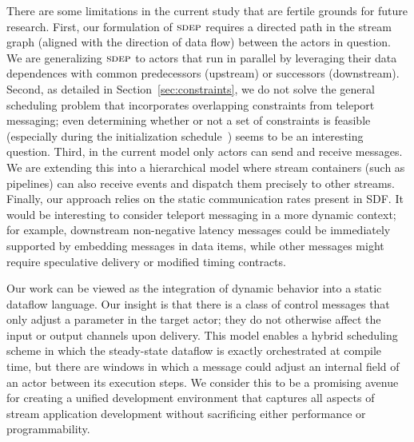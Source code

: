 There are some limitations in the current study that are fertile
grounds for future research.  First, our formulation of $\textsc{sdep}$
requires a directed path in the stream graph (aligned with the
direction of data flow) between the actors in question.  We are
generalizing $\textsc{sdep}$ to actors that run in parallel by leveraging
their data dependences with common predecessors (upstream) or
successors (downstream).  Second, as detailed in
Section~\ref{sec:constraints}, we do not solve the general scheduling
problem that incorporates overlapping constraints from teleport
messaging; even determining whether or not a set of constraints is
feasible (especially during the initialization
schedule~\cite{karczma-thesis}) seems to be an interesting question.
Third, in the current model only actors can send and receive messages.
We are extending this into a hierarchical model where stream
containers (such as pipelines) can also receive events and dispatch
them precisely to other streams.  Finally, our approach relies on the
static communication rates present in SDF.  It would be interesting to
consider teleport messaging in a more dynamic context; for example,
downstream non-negative latency messages could be immediately
supported by embedding messages in data items, while other messages
might require speculative delivery or modified timing contracts.

Our work can be viewed as the integration of dynamic behavior into a
static dataflow language.  Our insight is that there is a class of
control messages that only adjust a parameter in the target actor;
they do not otherwise affect the input or output channels upon
delivery.  This model enables a hybrid scheduling scheme in which the
steady-state dataflow is exactly orchestrated at compile time, but
there are windows in which a message could adjust an internal field of
an actor between its execution steps.  We consider this to be a
promising avenue for creating a unified development environment that
captures all aspects of stream application development without
sacrificing either performance or programmability.
